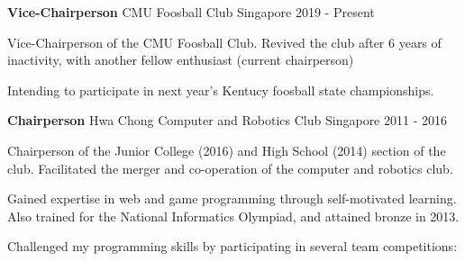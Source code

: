 

\begin{cventries}
	
	
	\cventry
	{\textbf{Vice-Chairperson}} %
	{CMU Foosball Club} %
	{Singapore} %
	{2019 - Present} %
	{ %
		\begin{cvitems}
			\item {Vice-Chairperson of the CMU Foosball Club. Revived the club after 6 years of inactivity, with another fellow enthusiast (current chairperson)}
			\item {Intending to participate in next year's Kentucy foosball state championships.}
		\end{cvitems}
	}
\end{cventries}

\begin{cventries}


\cventry
{\textbf{Chairperson}} %
{Hwa Chong Computer and Robotics Club} %
{Singapore} %
{2011 - 2016} %
{ %
\begin{cvitems}
	\item {Chairperson of the Junior College (2016) and High School (2014) section of the club. \newline
		Facilitated the merger and co-operation of the computer and robotics club.}
	\item {Gained expertise in web and game programming through self-motivated learning. \newline
		Also trained for the National Informatics Olympiad, and attained bronze in 2013.}
	\item {Challenged my programming skills by participating in several team competitions:}
\end{cvitems}
}
\end{cventries}

